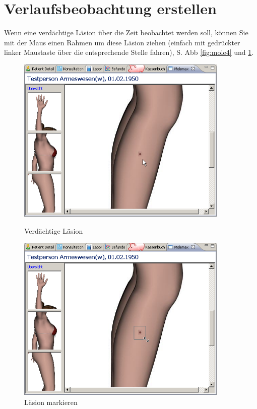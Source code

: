 \documentclass[a4paper]{scrartcl}
\begin{document}
\section{Verlaufsbeobachtung erstellen}
Wenn eine verdächtige Läsion über die Zeit beobachtet werden soll, können Sie mit der Maus einen Rahmen um diese Läsion ziehen (einfach mit gedrückter linker Maustaste über die entsprechende Stelle fahren), S. Abb \ref{fig:mole4} und \ref{fig:mole5}.

\begin{figure}[htp]
    \begin{minipage}{0.45\textwidth}
        \centering
        \includegraphics[width=0.9\textwidth]{molemax4}
         \caption{Verdächtige Läsion}
         \label{fig:mole4}
     \end{minipage}
    \hfill
    \begin{minipage}{0.45\textwidth}
        \centering
        \includegraphics[width=0.9\textwidth]{molemax5}
        \caption{Läsion markieren}
        \label{fig:mole5}
     \end{minipage}
\end{figure}
\end{document}
